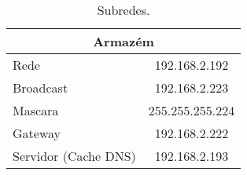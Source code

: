 \documentclass[a4paper,12pt]{article}
\begin{document}
\begin{table}[ht]
\begin{tabular}{ l | c }
      \multicolumn{2}{c}{Armazém} \\\hline 
      Rede & 192.168.2.192 \\\hline 
      Broadcast & 192.168.2.223 \\\hline 
      Mascara & 255.255.255.224 \\\hline
      Gateway & 192.168.2.222 \\\hline
      Servidor (Cache DNS) & 192.168.2.193 \\\hline
      \bottomrule
   \end{tabular}
   \caption{Subredes.}
   \label{tab:subredes}
\end{table}
\end{document}
